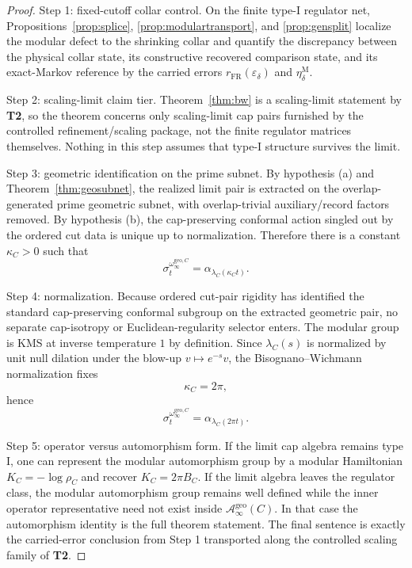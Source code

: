 \documentclass[11pt]{article}
\begin{document}
\begin{proof}
Step 1: fixed-cutoff collar control. On the finite type-I regulator net, Propositions~\ref{prop:splice}, \ref{prop:modulartransport}, and \ref{prop:gensplit} localize the modular defect to the shrinking collar and quantify the discrepancy between the physical collar state, its constructive recovered comparison state, and its exact-Markov reference by the carried errors \(r_{\mathrm{FR}}(\varepsilon_\delta)\) and \(\eta_\delta^{\mathrm M}\).

Step 2: scaling-limit claim tier. Theorem~\ref{thm:bw} is a scaling-limit statement by \textbf{T2}, so the theorem concerns only scaling-limit cap pairs furnished by the controlled refinement/scaling package, not the finite regulator matrices themselves. Nothing in this step assumes that type-I structure survives the limit.

Step 3: geometric identification on the prime subnet. By hypothesis \textup{(a)} and Theorem~\ref{thm:geosubnet}, the realized limit pair is extracted on the overlap-generated prime geometric subnet, with overlap-trivial auxiliary/record factors removed. By hypothesis \textup{(b)}, the cap-preserving conformal action singled out by the ordered cut data is unique up to normalization. Therefore there is a constant \(\kappa_C>0\) such that
\[
\sigma_t^{\omega_\infty^{\mathrm{geo},C}}=\alpha_{\lambda_C(\kappa_C t)}.
\]

Step 4: normalization. Because ordered cut-pair rigidity has identified the standard cap-preserving conformal subgroup on the extracted geometric pair, no separate cap-isotropy or Euclidean-regularity selector enters. The modular group is KMS at inverse temperature \(1\) by definition. Since \(\lambda_C(s)\) is normalized by unit null dilation under the blow-up \(v\mapsto e^{-s}v\), the Bisognano--Wichmann normalization fixes
\[
\kappa_C=2\pi,
\]
hence
\[
\sigma_t^{\omega_\infty^{\mathrm{geo},C}}
=
\alpha_{\lambda_C(2\pi t)}.
\]

Step 5: operator versus automorphism form. If the limit cap algebra remains type I, one can represent the modular automorphism group by a modular Hamiltonian \(K_C=-\log\rho_C\) and recover \(K_C=2\pi B_C\). If the limit algebra leaves the regulator class, the modular automorphism group remains well defined while the inner operator representative need not exist inside \(\mathcal A_\infty^{\mathrm{geo}}(C)\). In that case the automorphism identity is the full theorem statement. The final sentence is exactly the carried-error conclusion from Step 1 transported along the controlled scaling family of \textbf{T2}.
\end{proof}
\end{document}
